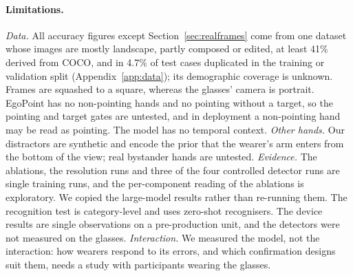 \paragraph{Limitations.} \emph{Data.} All accuracy figures except Section~\ref{sec:realframes} come from one dataset whose images are mostly landscape, partly composed or edited, at least 41\% derived from COCO, and in 4.7\% of test cases duplicated in the training or validation split (Appendix~\ref{app:data}); its demographic coverage is unknown. Frames are squashed to a square, whereas the glasses' camera is portrait. EgoPoint has no non-pointing hands and no pointing without a target, so the pointing and target gates are untested, and in deployment a non-pointing hand may be read as pointing. The model has no temporal context. \emph{Other hands.} Our distractors are synthetic and encode the prior that the wearer's arm enters from the bottom of the view; real bystander hands are untested. \emph{Evidence.} The ablations, the resolution runs and three of the four controlled detector runs are single training runs, and the per-component reading of the ablations is exploratory. We copied the large-model results rather than re-running them. The recognition test is category-level and uses zero-shot recognisers. The device results are single observations on a pre-production unit, and the detectors were not measured on the glasses. \emph{Interaction.} We measured the model, not the interaction: how wearers respond to its errors, and which confirmation designs suit them, needs a study with participants wearing the glasses.
